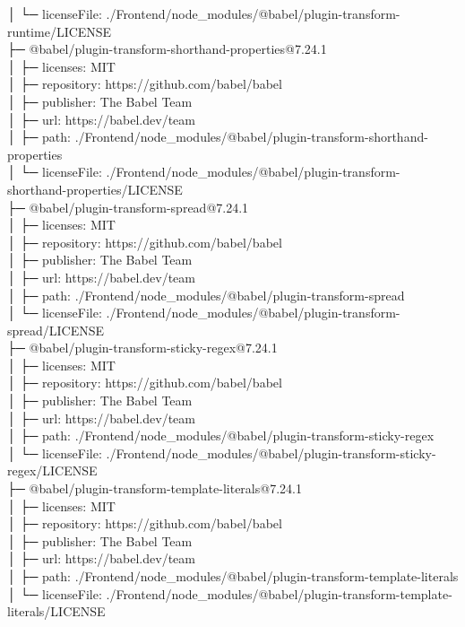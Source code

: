 │  └─ licenseFile: ./Frontend/node\_modules/@babel/plugin-transform-runtime/LICENSE\\
├─ @babel/plugin-transform-shorthand-properties@7.24.1\\
│  ├─ licenses: MIT\\
│  ├─ repository: https://github.com/babel/babel\\
│  ├─ publisher: The Babel Team\\
│  ├─ url: https://babel.dev/team\\
│  ├─ path: ./Frontend/node\_modules/@babel/plugin-transform-shorthand-properties\\
│  └─ licenseFile: ./Frontend/node\_modules/@babel/plugin-transform-shorthand-properties/LICENSE\\
├─ @babel/plugin-transform-spread@7.24.1\\
│  ├─ licenses: MIT\\
│  ├─ repository: https://github.com/babel/babel\\
│  ├─ publisher: The Babel Team\\
│  ├─ url: https://babel.dev/team\\
│  ├─ path: ./Frontend/node\_modules/@babel/plugin-transform-spread\\
│  └─ licenseFile: ./Frontend/node\_modules/@babel/plugin-transform-spread/LICENSE\\
├─ @babel/plugin-transform-sticky-regex@7.24.1\\
│  ├─ licenses: MIT\\
│  ├─ repository: https://github.com/babel/babel\\
│  ├─ publisher: The Babel Team\\
│  ├─ url: https://babel.dev/team\\
│  ├─ path: ./Frontend/node\_modules/@babel/plugin-transform-sticky-regex\\
│  └─ licenseFile: ./Frontend/node\_modules/@babel/plugin-transform-sticky-regex/LICENSE\\
├─ @babel/plugin-transform-template-literals@7.24.1\\
│  ├─ licenses: MIT\\
│  ├─ repository: https://github.com/babel/babel\\
│  ├─ publisher: The Babel Team\\
│  ├─ url: https://babel.dev/team\\
│  ├─ path: ./Frontend/node\_modules/@babel/plugin-transform-template-literals\\
│  └─ licenseFile: ./Frontend/node\_modules/@babel/plugin-transform-template-literals/LICENSE\\
